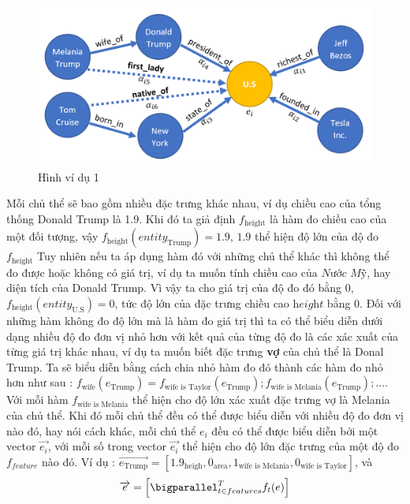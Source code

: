 \begin{figure}[htp]
\centering
\includegraphics[width=\textwidth,height=\textheight,keepaspectratio]{images/graph_example.png}
\caption{Hình ví dụ 1}
\label{fig:vd1}
\end{figure}

Mỗi chủ thể sẽ bao gồm nhiều đặc trưng khác nhau, ví dụ chiều cao của tổng thống Donald Trump là 1.9. Khi đó ta giả định $f_\text{height}$ là hàm đo chiều cao của một đối tượng, vậy $f_\text{height}(entity_\text{Trump}) = 1.9$, $1.9$ thể hiện độ lớn của độ đo $f_\text{height}$ Tuy nhiên nếu ta áp dụng hàm đó với những chủ thể khác thì không thể đo được hoặc không có giá trị, ví dụ ta muốn tính chiều cao của $\textit{Nước Mỹ}$, hay diện tích của Donald Trump. Vì vậy ta cho giá trị của độ đo đó bằng $0$, $f_\text{height}(entity_\text{U.S}) = 0$, tức độ lớn của đặc trưng chiều cao $\textit{height}$ bằng 0. Đối với những hàm không đo độ lớn mà là hàm đo giá trị thì ta có thể biểu diễn dưới dạng nhiều độ đo đơn vị nhỏ hơn với kết quả của từng độ đo là các xác xuất của từng giá trị khác nhau, ví dụ ta muốn biết đặc trưng \textbf{vợ} của chủ thể là Donal Trump. Ta sẽ biểu diễn bằng cách chia nhỏ hàm đo đó thành các hàm đo nhỏ hơn như sau : \(f_\text{wife}(e_\text{Trump}) = f_\text{wife is Taylor}(e_\text{Trump}); f_\text{wife is Melania}(e_\text{Trump});... \). Với mỗi hàm $f_\text{wife is Melania}$ thể hiện cho độ lớn xác xuất đặc trưng vợ là Melania của chủ thể. Khi đó mỗi chủ thể đều có thể được biểu diễn với nhiều độ đo đơn vị nào đó, hay nói cách khác, mỗi chủ thể $e_i$ đều có thể được biểu diễn bởi một vector $\overrightarrow{e_i}$, với mỗi số trong vector $\overrightarrow{e_i}$ thể hiện cho độ lớn đặc trưng của một độ đo $f_{feature}$ nào đó.  Ví dụ : $\overrightarrow{e_\text{Trump}} = [1.9_{\text{heigh}}, 0_{\text{area}}, 1_\text{wife is Melania}, 0_\text{wife is Taylor}]$, và 
$$
\overrightarrow{e}=\Big[ \bigparallel_{t \in features}^{T} f_{t}{}(e) \Big]
$$

